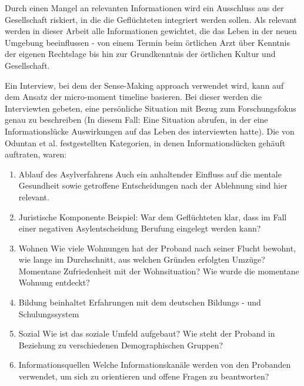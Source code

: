 Durch einen Mangel an relevanten Informationen wird ein Ausschluss aus der Gesellschaft riskiert, in die die Gefl\"uchteten integriert werden sollen. \cite{andrade2016information}\newline
Als relevant werden in dieser Arbeit alle Informationen gewichtet, die das Leben in der neuen Umgebung beeinflussen - von einem Termin beim \"ortlichen Arzt \"uber Kenntnis der eigenen Rechtslage bis hin zur Grundkenntnis der \"ortlichen Kultur und Gesellschaft. \cite{schreieck2017supporting}\newline


Ein Interview, bei dem der Sense-Making approach verwendet wird, kann auf dem Ansatz der micro-moment timeline basieren. Bei dieser werden die Interviewten gebeten, eine pers\"onliche Situation mit Bezug zum Forschungsfokus genau zu beschreiben (In diesem Fall: Eine Situation abrufen, in der eine Informationsl\"ucke Auswirkungen auf das Leben des interviewten hatte).
Die von Oduntan et al. festgestellten Kategorien, in denen Informationsl\"ucken geh\"auft auftraten, waren:
\begin{enumerate}
    \item Ablauf des Asylverfahrens\newline
    Auch ein anhaltender Einfluss auf die mentale Gesundheit sowie getroffene Entscheidungen nach der Ablehnung sind hier relevant.
    \item Juristische Komponente \newline
    Beispiel: War dem Gefl\"uchteten klar, dass im Fall einer negativen Asylentscheidung Berufung eingelegt werden kann?
    \item Wohnen \newline
    Wie viele Wohnungen hat der Proband nach seiner Flucht bewohnt, wie lange im Durchschnitt, aus welchen Gr\"unden erfolgten Umz\"uge? Momentane Zufriedenheit mit der Wohnsituation? Wie wurde die momentane Wohnung entdeckt?
    \item Bildung \newline
    beinhaltet Erfahrungen mit dem deutschen Bildungs - und Schulungssystem
    \item Sozial\newline
    Wie ist das soziale Umfeld aufgebaut? Wie steht der Proband in Beziehung zu verschiedenen Demographischen Gruppen?
    \item Informationsquellen\newline
    Welche Informationskan\"ale werden von den Probanden verwendet, um sich zu orientieren und offene Fragen zu beantworten?
\end{enumerate}
